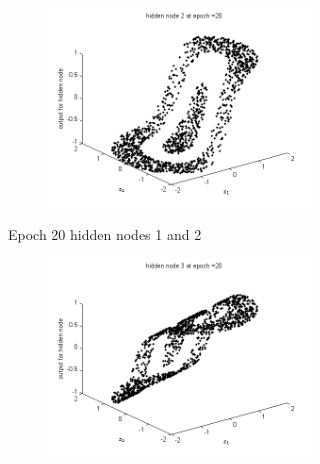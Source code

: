 \documentclass{article}
\begin{document}
\begin{figure}
\begin{figure}
\begin{subfigure}{.5\textwidth}
\end{subfigure}%
\begin{subfigure}{.5\textwidth}
  \centering
  \includegraphics[width=.8\linewidth]{Classification/nonlinearlySeparable/h20_2}
  \end{subfigure}
\caption{Epoch 20 hidden nodes 1 and 2}

\end{figure}

\begin{figure}
\begin{subfigure}{.5\textwidth}
  \centering
  \includegraphics[width=.8\linewidth]{Classification/nonlinearlySeparable/h20_3}
 

\end{subfigure}
\end{figure}
\end{figure}
\end{document}
